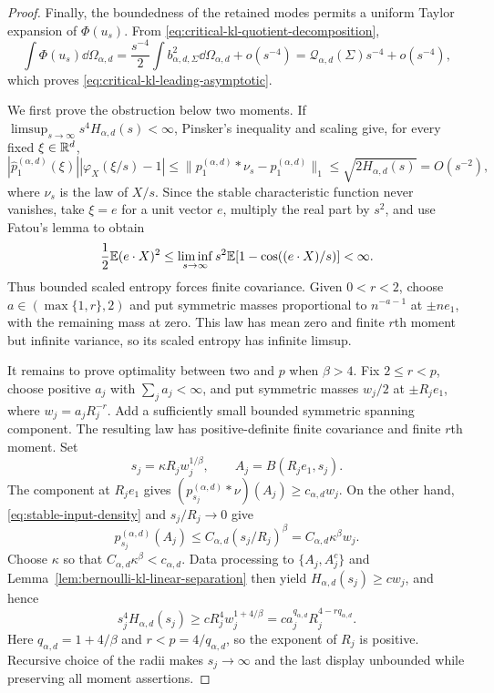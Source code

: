 \begin{proof}
Finally, the boundedness of the retained modes permits a uniform Taylor
expansion of \(\Phi(u_s)\).  From
\eqref{eq:critical-kl-quotient-decomposition},
\[
 \int\Phi(u_s)\dd\Omega_{\alpha,d}
 =\frac{s^{-4}}2\int b_{\alpha,d,\Sigma}^2\dd\Omega_{\alpha,d}
   +o(s^{-4})
 =\mathcal Q_{\alpha,d}(\Sigma)s^{-4}+o(s^{-4}),
\]
which proves \eqref{eq:critical-kl-leading-asymptotic}.

We first prove the obstruction below two moments.  If
\(\limsup_{s\to\infty}s^4H_{\alpha,d}(s)<\infty\), Pinsker's inequality
and scaling give, for every fixed \(\xi\in\mathbb{R}^d\),
\[
 |\widehat p_1^{(\alpha,d)}(\xi)|
 |\varphi_X(\xi/s)-1|
 \le \|p_1^{(\alpha,d)}*\nu_s-p_1^{(\alpha,d)}\|_1
 \le \sqrt{2H_{\alpha,d}(s)}=O(s^{-2}),
\]
where \(\nu_s\) is the law of \(X/s\).  Since the stable characteristic
function never vanishes, take \(\xi=e\) for a unit vector \(e\), multiply
the real part by \(s^2\), and use Fatou's lemma to obtain
\[
 \frac12\mathbb{E}(e\cdot X)^2
 \le \liminf_{s\to\infty}s^2
       \mathbb{E}[1-\cos((e\cdot X)/s)]<\infty.
\]
Thus bounded scaled entropy forces finite covariance.  Given \(0<r<2\),
choose \(a\in(\max\{1,r\},2)\) and put symmetric masses proportional to
\(n^{-a-1}\) at \(\pm ne_1\), with the remaining mass at zero.  This law
has mean zero and finite \(r\)th moment but infinite variance, so its scaled
entropy has infinite limsup.

It remains to prove optimality between two and \(p\) when \(\beta>4\).
Fix \(2\le r<p\), choose positive \(a_j\) with \(\sum_ja_j<\infty\), and
put symmetric masses \(w_j/2\) at \(\pm R_je_1\), where
\(w_j=a_jR_j^{-r}\).  Add a sufficiently small bounded symmetric spanning
component.  The resulting law has positive-definite finite covariance and
finite \(r\)th moment.  Set
\[
 s_j=\kappa R_jw_j^{1/\beta},\qquad
 A_j=B(R_je_1,s_j).
\]
The component at \(R_je_1\) gives
\((p_{s_j}^{(\alpha,d)}*\nu)(A_j)\ge c_{\alpha,d}w_j\).  On the other hand,
\eqref{eq:stable-input-density} and \(s_j/R_j\to0\) give
\[
 p_{s_j}^{(\alpha,d)}(A_j)
 \le C_{\alpha,d}(s_j/R_j)^\beta
 =C_{\alpha,d}\kappa^\beta w_j.
\]
Choose \(\kappa\) so that
\(C_{\alpha,d}\kappa^\beta<c_{\alpha,d}\).  Data processing to
\(\{A_j,A_j^c\}\) and
Lemma~\ref{lem:bernoulli-kl-linear-separation} then yield
\(H_{\alpha,d}(s_j)\ge c w_j\), and hence
\[
 s_j^4H_{\alpha,d}(s_j)
 \ge cR_j^4w_j^{1+4/\beta}
 =ca_j^{q_{\alpha,d}}R_j^{4-rq_{\alpha,d}}.
\]
Here \(q_{\alpha,d}=1+4/\beta\) and
\(r<p=4/q_{\alpha,d}\), so the exponent of \(R_j\) is positive.
Recursive choice of the radii makes \(s_j\to\infty\) and the last display
unbounded while preserving all moment assertions.
\end{proof}

